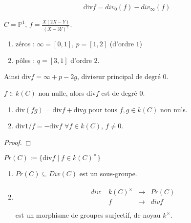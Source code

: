             \begin{remq}
                \begin{align*}
                    \mathrm{div} f = div_0(f) - div_\infty(f)             
                \end{align*}
            \end{remq}
            \begin{expl}
                $C = \mathbb{P}^1$, $f = \frac{X(2X - Y)}{(X - 3Y)^2}$.
                \begin{enumerate}
                    \item zéros : $\infty = [0,1]$, $p = [1,2]$ (d'ordre $1$)
                    \item pôles : $q = [3,1]$ d'ordre $2$.
                \end{enumerate}
                Ainsi $\mathrm{div} f = \infty + p - 2g$, diviseur principal de degré $0$.
            \end{expl}
            \begin{theo}
                $f \in k(C)$ non nulle, alors $\mathrm{div} f$ est de degré $0$.
            \end{theo}
            \begin{prop}
                \begin{enumerate}
                    \item $\mathrm{div} (fg) = \mathrm{div} f + \mathrm{div} g$ pour tous $f,g \in k(C)$ non nuls.
                    \item $\mathrm{div} 1/f = - \mathrm{div} f$ $\forall f \in k(C)$, $f \neq 0$.
                \end{enumerate}
            \end{prop}
            \begin{proof}
            \end{proof}
            \begin{defi}
                $Pr(C) := \{\mathrm{div} f \mid f \in k(C)^\times\}$
            \end{defi}
            \begin{prop}
                \begin{enumerate}
                    \item $Pr(C) \subseteq Div(C)$ est un sous-groupe.
                    \item \begin{align*}
                        \begin{array}{cccc}
                            div : & k(C)^\times & \to & Pr(C) \\
                            & f & \mapsto & div f \\
                        \end{array}
                    \end{align*}
                    est un morphisme de groupes surjectif, de noyau $k^\times$.
                \end{enumerate}
            \end{prop}
